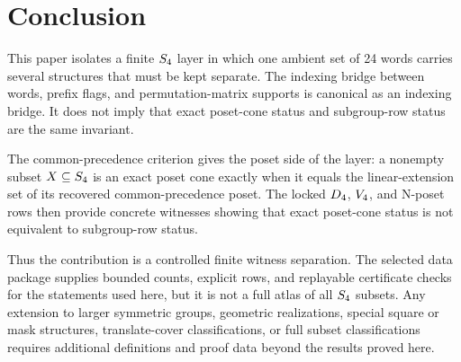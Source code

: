 \section{Conclusion}
\label{sec:conclusion}

This paper isolates a finite \(S_4\) layer in which one ambient set of 24 words carries several structures that must be kept separate. The indexing bridge between words, prefix flags, and permutation-matrix supports is canonical as an indexing bridge. It does not imply that exact poset-cone status and subgroup-row status are the same invariant.

The common-precedence criterion gives the poset side of the layer: a nonempty subset \(X\subseteq S_4\) is an exact poset cone exactly when it equals the linear-extension set of its recovered common-precedence poset. The locked \(D_4\), \(V_4\), and N-poset rows then provide concrete witnesses showing that exact poset-cone status is not equivalent to subgroup-row status.

Thus the contribution is a controlled finite witness separation. The selected data package supplies bounded counts, explicit rows, and replayable certificate checks for the statements used here, but it is not a full atlas of all \(S_4\) subsets. Any extension to larger symmetric groups, geometric realizations, special square or mask structures, translate-cover classifications, or full subset classifications requires additional definitions and proof data beyond the results proved here.
